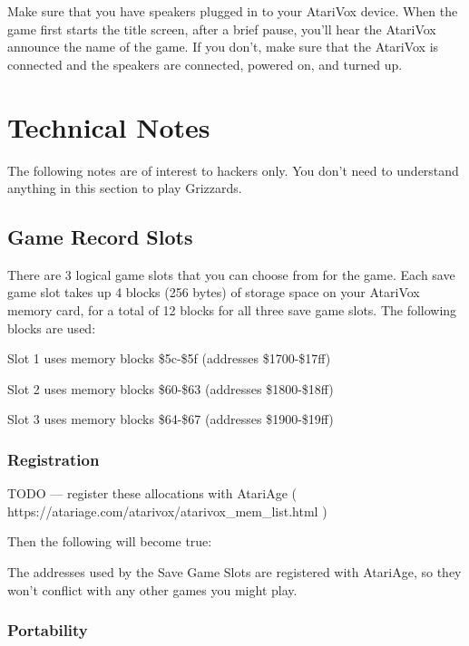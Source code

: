 \documentclass[10pt,twoside,openright]{memoir}
\begin{document}
Make sure that you have speakers plugged in to your AtariVox
device. When the game first starts the title screen, after a brief
pause, you'll hear the AtariVox announce the name of the game. If you
don't, make sure that the AtariVox is connected and the speakers are
connected, powered on, and turned up.

\chapter{Technical Notes}

The following notes are of interest to hackers only. You don't need to
understand anything in this section to play Grizzards.

\section{Game Record Slots}

There are 3  logical game slots that  you can choose from  for the game.
Each save game  slot takes up 4  blocks (256 bytes) of  storage space on
your AtariVox memory card,  for a total of 12 blocks  for all three save
game slots. The following blocks are used:

\begin{enumeration}
\item Slot 1 uses memory blocks \$5c-\$5f (addresses \$1700-\$17ff)
\item Slot 2 uses memory blocks \$60-\$63 (addresses \$1800-\$18ff)
\item Slot 3 uses memory blocks \$64-\$67 (addresses \$1900-\$19ff)
\end{enumeration}

\subsection{Registration}

TODO --- register these allocations with AtariAge (
https://atariage.com/atarivox/atarivox\_mem\_list.html )

Then the following will become true:

The addresses used by the Save Game Slots are registered with
AtariAge, so they won't conflict with any other games you might play.

\subsection{Portability}
\end{document}

